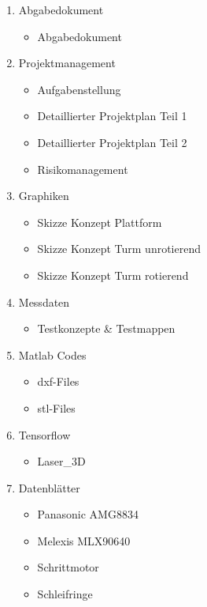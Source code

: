 \begin{enumerate}
	\item Abgabedokument
	\begin{itemize}
		\item Abgabedokument
	\end{itemize}
	\item Projektmanagement
	\begin{itemize}
		\item Aufgabenstellung
		\item Detaillierter Projektplan Teil 1
		\item Detaillierter Projektplan Teil 2
		\item Risikomanagement
	\end{itemize}
	\item Graphiken
	\begin{itemize}
		\item Skizze Konzept Plattform
		\item Skizze Konzept Turm unrotierend
		\item Skizze Konzept Turm rotierend
	\end{itemize}
	\item Messdaten
	\begin{itemize}
	\item Testkonzepte \& Testmappen
	\end{itemize}
	\item Matlab Codes
	\begin{itemize}
		\item dxf-Files
		\item stl-Files
	\end{itemize}
	\item Tensorflow
	\begin{itemize}
		\item Laser\_3D
	\end{itemize}
	\item Datenblätter
	\begin{itemize}
		\item Panasonic AMG8834
		\item Melexis MLX90640
		\item Schrittmotor
		\item Schleifringe
	\end{itemize}
\end{enumerate}

\newpage



